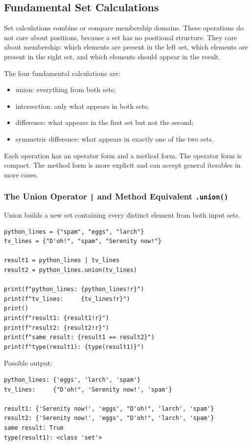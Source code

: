 \subsection{Fundamental Set Calculations}

Set calculations combine or compare membership domains. These operations do not care about positions, because a set has no positional structure. They care about membership: which elements are present in the left set, which elements are present in the right set, and which elements should appear in the result.

The four fundamental calculations are:

\begin{itemize}
    \item union: everything from both sets;
    \item intersection: only what appears in both sets;
    \item difference: what appears in the first set but not the second;
    \item symmetric difference: what appears in exactly one of the two sets.
\end{itemize}

Each operation has an operator form and a method form. The operator form is compact. The method form is more explicit and can accept general iterables in more cases.

\subsubsection{The Union Operator \texttt{|} and Method Equivalent \texttt{.union()}}

Union builds a new set containing every distinct element from both input sets.

\begin{verbatim}
python_lines = {"spam", "eggs", "larch"}
tv_lines = {"D'oh!", "spam", "Serenity now!"}

result1 = python_lines | tv_lines
result2 = python_lines.union(tv_lines)

print(f"python_lines: {python_lines!r}")
print(f"tv_lines:     {tv_lines!r}")
print()
print(f"result1: {result1!r}")
print(f"result2: {result2!r}")
print(f"same result: {result1 == result2}")
print(f"type(result1): {type(result1)}")
\end{verbatim}

Possible output:

\begin{verbatim}
python_lines: {'eggs', 'larch', 'spam'}
tv_lines:     {"D'oh!", 'Serenity now!', 'spam'}

result1: {'Serenity now!', 'eggs', "D'oh!", 'larch', 'spam'}
result2: {'Serenity now!', 'eggs', "D'oh!", 'larch', 'spam'}
same result: True
type(result1): <class 'set'>
\end{verbatim}

